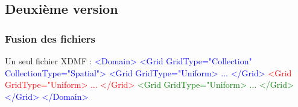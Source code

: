 \documentclass{beamer}
\begin{document}
\subsection{Deuxième version}
\begin{frame}
\frametitle{Fusion des fichiers}
Un seul fichier XDMF :\newline
\textcolor{blue}{
<Domain>\newline
    <Grid GridType="Collection" CollectionType="Spatial">\newline
    <Grid GridType="Uniform>\newline
    ...\newline
    </Grid>}\newline
\textcolor{red}{
    <Grid GridType="Uniform>\newline
    ...\newline
    </Grid>}\newline
\textcolor{green}{
    <Grid GridType="Uniform>\newline
    ...\newline
    </Grid>}\newline
\textcolor{blue}{
    </Grid>\newline
</Domain>}\newline
\end{frame}
\end{document}

